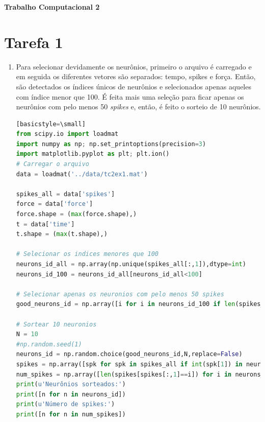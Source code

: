 \documentclass[12pt,letterpaper]{article}
\newcommand\hwnumber{2}
\begin{document}
\centerline{\textbf{\Large Trabalho Computacional \hwnumber}}

\centerline{}

\section*{Tarefa 1}
\begin{enumerate}[label=(\alph*)]  %
    \item Para selecionar devidamente os neurônios, primeiro o arquivo é carregado e em seguida os diferentes vetores são separados: tempo, spikes e força. Então, são detectados os índices únicos de neurônios e selecionados apenas aqueles com índice menor que 100. É feita mais uma seleção para ficar apenas os neurônios com pelo menos 50 {\it spikes} e, então, é feito o sorteio de 10 neurônios.
    
    \begin{lstlisting}[language=Python][basicstyle=\small]
from scipy.io import loadmat
import numpy as np; np.set_printoptions(precision=3)
import matplotlib.pyplot as plt; plt.ion()
# Carregar o arquivo
data = loadmat('../data/tc2ex1.mat')

spikes_all = data['spikes']
force = data['force']
force.shape = (max(force.shape),)
t = data['time']
t.shape = (max(t.shape),)

# Selecionar os indices menores que 100
neurons_id_all = np.array(np.unique(spikes_all[:,1]),dtype=int)
neurons_id_100 = neurons_id_all[neurons_id_all<100]

# Selecionar apenas os neuronios com pelo menos 50 spikes
good_neurons_id = np.array([i for i in neurons_id_100 if len(spikes_all[spikes_all[:,1]==i])>50])

# Sortear 10 neuronios
N = 10
#np.random.seed(1)
neurons_id = np.random.choice(good_neurons_id,N,replace=False)
spikes = np.array([spk for spk in spikes_all if int(spk[1]) in neurons_id])
num_spikes = np.array([len(spikes[spikes[:,1]==i]) for i in neurons_id])
print(u'Neurônios sorteados:')
print([n for n in neurons_id])
print(u'Número de spikes:')
print([n for n in num_spikes])
    \end{lstlisting}


\end{enumerate}
\end{document}

